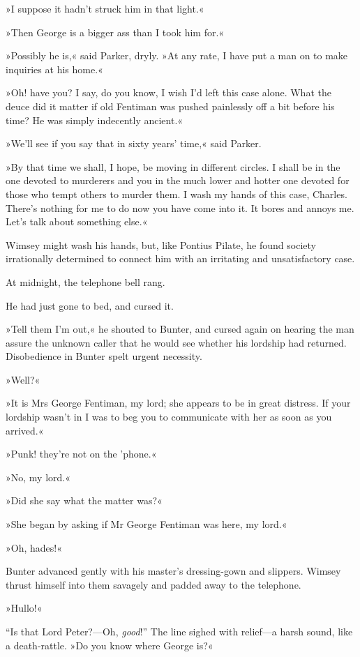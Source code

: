 »I suppose it hadn't struck him in that light.«

»Then George is a bigger ass than I took him for.«

»Possibly he is,« said Parker, dryly. »At any rate, I have put a man on to make inquiries at his home.«

»Oh! have you? I say, do you know, I wish I'd left this case alone. What the deuce did it matter if old Fentiman was pushed painlessly off a bit before his time? He was simply indecently ancient.«

»We'll see if you say that in sixty years' time,« said Parker.

»By that time we shall, I hope, be moving in different circles. I shall be in the one devoted to murderers and you in the much lower and hotter one devoted for those who tempt others to murder them. I wash my hands of this case, Charles. There's nothing for me to do now you have come into it. It bores and annoys me. Let's talk about something else.«

Wimsey might wash his hands, but, like Pontius Pilate, he found society irrationally determined to connect him with an irritating and unsatisfactory case.

At midnight, the telephone bell rang.

He had just gone to bed, and cursed it.

»Tell them I'm out,« he shouted to Bunter, and cursed again on hearing the man assure the unknown caller that he would see whether his lordship had returned. Disobedience in Bunter spelt urgent necessity.

»Well?«

»It is Mrs George Fentiman, my lord; she appears to be in great distress. If your lordship wasn't in I was to beg you to communicate with her as soon as you arrived.«

»Punk! they're not on the 'phone.«

»No, my lord.«

»Did she say what the matter was?«

»She began by asking if Mr George Fentiman was here, my lord.«

»Oh, hades!«

Bunter advanced gently with his master's dressing-gown and slippers. Wimsey thrust himself into them savagely and padded away to the telephone.

»Hullo!«

\enquote{Is that Lord Peter?---Oh, \textit{good}!} The line sighed with relief\allowbreak---\allowbreak a harsh sound, like a death-rattle. »Do you know where George is?«

